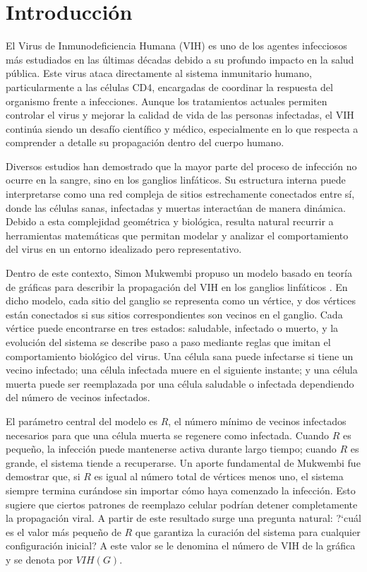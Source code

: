 \documentclass[12pt,titlepage,twoside,openright]{book}
\begin{document}
\chapter{Introducci\'on}

El Virus de Inmunodeficiencia Humana (VIH) es uno de los agentes infecciosos m\'as estudiados en las \'ultimas d\'ecadas debido a su profundo impacto en la salud p\'ublica. Este virus ataca directamente al sistema inmunitario humano, particularmente a las c\'elulas CD4, encargadas de coordinar la respuesta del organismo frente a infecciones. Aunque los tratamientos actuales permiten controlar el virus y mejorar la calidad de vida de las personas infectadas, el VIH contin\'ua siendo un desaf\'io cient\'ifico y m\'edico, especialmente en lo que respecta a comprender a detalle su propagaci\'on dentro del cuerpo humano.

Diversos estudios han demostrado que la mayor parte del proceso de infecci\'on no ocurre en la sangre, sino en los ganglios linf\'aticos. Su estructura interna puede interpretarse como una red compleja de sitios estrechamente conectados entre s\'i, donde las c\'elulas sanas, infectadas y muertas interact\'uan de manera din\'amica. Debido a esta complejidad geom\'etrica y biol\'ogica, resulta natural recurrir a herramientas matem\'aticas que permitan modelar y analizar el comportamiento del virus en un entorno idealizado pero representativo. 

Dentro de este contexto, Simon Mukwembi propuso un modelo basado en teor\'ia de gr\'aficas para describir la propagaci\'on del VIH en los ganglios linf\'aticos \cite{Mukwembi}. En dicho modelo, cada sitio del ganglio se representa como un v\'ertice, y dos v\'ertices est\'an conectados si sus sitios correspondientes son vecinos en el ganglio. Cada v\'ertice puede encontrarse en tres estados: saludable, infectado o muerto, y la evoluci\'on del sistema se describe paso a paso mediante reglas que imitan el comportamiento biol\'ogico del virus. Una c\'elula sana puede infectarse si tiene un vecino infectado; una c\'elula infectada muere en el siguiente instante; y una c\'elula muerta puede ser reemplazada por una c\'elula saludable o infectada dependiendo del n\'umero de vecinos infectados. 

El par\'ametro central del modelo es $R$, el n\'umero m\'inimo de vecinos infectados necesarios para que una c\'elula muerta se regenere como infectada. Cuando $R$ es peque\~no, la infecci\'on puede mantenerse activa durante largo tiempo; cuando $R$ es grande, el sistema tiende a recuperarse. Un aporte fundamental de Mukwembi fue demostrar que, si $R$ es igual al n\'umero total de v\'ertices menos uno, el sistema siempre termina cur\'andose sin importar c\'omo haya comenzado la infecci\'on. Esto sugiere que ciertos patrones de reemplazo celular podr\'ian detener completamente la propagaci\'on viral. A partir de este resultado surge una pregunta natural: ?`cu\'al es el valor m\'as peque\~no de $R$ que garantiza la curaci\'on del sistema para cualquier configuraci\'on inicial? A este valor se le denomina el n\'umero de VIH de la gr\'afica y se denota por $VIH(G)$.
\end{document}
